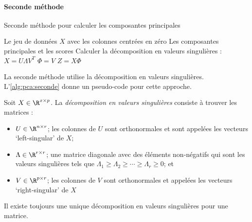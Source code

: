             \paragraph{Seconde méthode}
                \begin{algorithm}
                    \caption{Seconde méthode pour calculer les composantes principales}
                    \label{alg:pca:seconde}
                    \begin{algorithmic}
                        \Require Le jeu de données \(X\) avec les colonnes centrées en zéro
                        \Ensure Les composantes principales et les scores
                        \Statex
                        \State Calculer la décomposition en valeurs singulières : \(X = U \Lambda V^T\)
                        \State \(\Phi = V\) 
                        \State \(Z = X\Phi\) 
                    \end{algorithmic}
                \end{algorithm}

                La seconde méthode utilise la décomposition en valeurs singulières. L'\cref{alg:pca:seconde} donne un pseudo-code pour cette approche.

                \begin{definition}
                    Soit \(X \in \R^{x\times p}\). La \textit{décomposition en valeurs singulières} consiste à trouver les matrices :
                    \begin{itemize}
                        \item \(U \in \R^{n \times r}\); les colonnes de \(U\) sont orthonormales et sont appelées les vecteurs `left-singular' de \(X\);
                        \item \(\Lambda \in \R^{r \times r}\); une matrice diagonale avec des éléments non-négatifs qui sont les valeurs singulières tels que \(\Lambda_1 \geq \Lambda_2 \geq \cdots \geq \Lambda_r \geq 0\); et
                        \item \(V \in \R^{p \times r}\); les colonnes de \(V\) sont orthonormales et appelées les vecteurs `right-singular' de \(X\)
                    \end{itemize}

                    Il existe toujours une unique décomposition en valeurs singulières pour une matrice.
                \end{definition}


